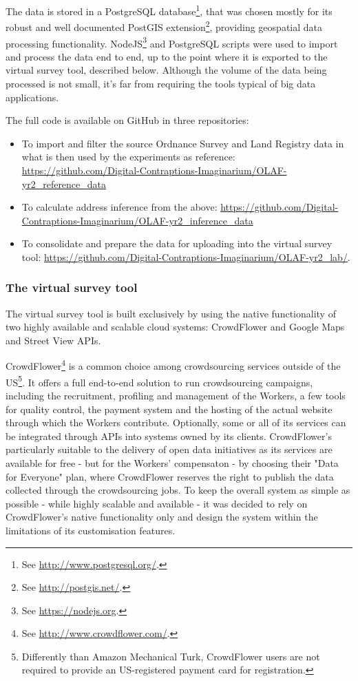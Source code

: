         The data is stored in a PostgreSQL database\footnote{See \url{http://www.postgresql.org/}.}, that was chosen mostly for its robust and well documented PostGIS extension\footnote{See \url{http://postgis.net/}.}, providing geospatial data processing functionality. NodeJS\footnote{See \url{https://nodejs.org}.} and PostgreSQL scripts were used to import and process the data end to end, up to the point where it is exported to the virtual survey tool, described below. Although the volume of the data being processed is not small, it's far from requiring the tools typical of big data applications. 
        
        The full code is available on GitHub in three repositories:
        
        \begin{itemize}
            \item To import and filter the source Ordnance Survey and Land Registry data in what is then used by the experiments as reference: \url{https://github.com/Digital-Contraptions-Imaginarium/OLAF-yr2_reference_data}
            \item To calculate address inference from the above: \url{https://github.com/Digital-Contraptions-Imaginarium/OLAF-yr2_inference_data}
            \item To consolidate and prepare the data for uploading into the virtual survey tool: \url{https://github.com/Digital-Contraptions-Imaginarium/OLAF-yr2_lab/}.
        \end{itemize}

    \subsubsection{The virtual survey tool}
    
        The virtual survey tool is built exclusively by using the native functionality of two highly available and scalable cloud systems: CrowdFlower and Google Maps and Street View APIs. 
        
        CrowdFlower\footnote{See \url{http://www.crowdflower.com/}.} is a common choice among crowdsourcing services outside of the US\footnote{Differently than Amazon Mechanical Turk, CrowdFlower users are not required to provide an US-registered payment card for registration.}. It offers a full end-to-end solution to run crowdsourcing campaigns, including the recruitment, profiling and management of the Workers, a few tools for quality control, the payment system and the hosting of the actual website through which the Workers contribute. Optionally, some or all of its services can be integrated through APIs into systems owned by its clients. CrowdFlower's particularly suitable to the delivery of open data initiatives as its services are available for free - but for the Workers' compensaton - by choosing their "Data for Everyone" plan, where CrowdFlower reserves the right to publish the data collected through the crowdsourcing jobs. To keep the overall system as simple as possible - while highly scalable and available - it was decided to rely on CrowdFlower's native functionality only and design the system within the limitations of its customisation features.

